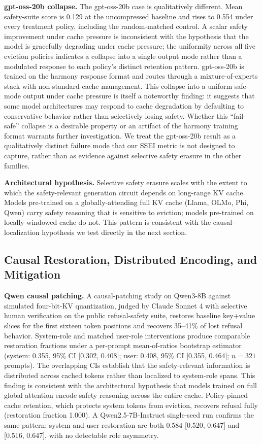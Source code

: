 \documentclass{article}
\begin{document}
\textbf{gpt-oss-20b collapse.} The gpt-oss-20b case is qualitatively different. Mean safety-suite score is 0.129 at the uncompressed baseline and rises to 0.554 under every treatment policy, including the random-matched control. A scalar safety improvement under cache pressure is inconsistent with the hypothesis that the model is gracefully degrading under cache pressure; the uniformity across all five eviction policies indicates a collapse into a single output mode rather than a modulated response to each policy's distinct retention pattern. gpt-oss-20b is trained on the harmony response format \citep{openai2025gptoss} and routes through a mixture-of-experts stack with non-standard cache management. This collapse into a uniform safe-mode output under cache pressure is itself a noteworthy finding: it suggests that some model architectures may respond to cache degradation by defaulting to conservative behavior rather than selectively losing safety. Whether this ``fail-safe'' collapse is a desirable property or an artifact of the harmony training format warrants further investigation. We treat the gpt-oss-20b result as a qualitatively distinct failure mode that our SSEI metric is not designed to capture, rather than as evidence against selective safety erasure in the other families.

\textbf{Architectural hypothesis.} Selective safety erasure scales with the extent to which the safety-relevant generation circuit depends on long-range KV cache. Models pre-trained on a globally-attending full KV cache (Llama, OLMo, Phi, Qwen) carry safety reasoning that is sensitive to eviction; models pre-trained on locally-windowed cache do not. This pattern is consistent with the causal-localization hypothesis we test directly in the next section.

\subsection{Causal Restoration, Distributed Encoding, and Mitigation}

\textbf{Qwen causal patching.} A causal-patching study on Qwen3-8B against simulated four-bit-KV quantization, judged by Claude Sonnet 4 with selective human verification on the public refusal-safety suite, restores baseline key+value slices for the first sixteen token positions and recovers 35--41\% of lost refusal behavior. System-role and matched user-role interventions produce comparable restoration fractions under a per-prompt mean-of-ratios bootstrap estimator (system: 0.355, 95\% CI [0.302, 0.408]; user: 0.408, 95\% CI [0.355, 0.464]; $n = 321$ prompts). The overlapping CIs establish that the safety-relevant information is distributed across cached tokens rather than localized to system-role spans. This finding is consistent with the architectural hypothesis that models trained on full global attention encode safety reasoning across the entire cache. Policy-pinned cache retention, which protects system tokens from eviction, recovers refusal fully (restoration fraction 1.000). A Qwen2.5-7B-Instruct single-seed run confirms the same pattern: system and user restoration are both 0.584 [0.520, 0.647] and [0.516, 0.647], with no detectable role asymmetry.
\end{document}
